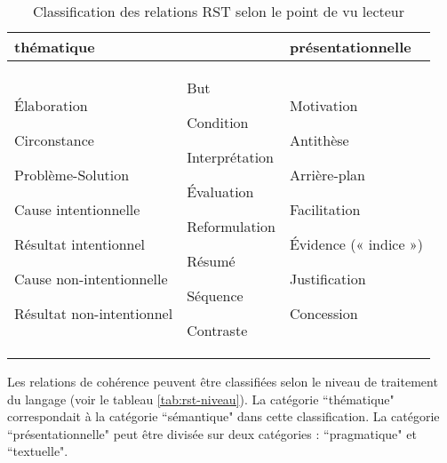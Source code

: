\documentclass{KodeBook}
\begin{document}
\begin{table}[ht]
	\centering\small
\begin{tabular}{p{}p{}p{}}
	\hline\hline
	\textbf{thématique} && \textbf{présentationnelle}\\
	\hline
	
	Élaboration
	
	Circonstance
	
	Problème-Solution
	
	Cause intentionnelle
	
	Résultat intentionnel
	
	Cause non-intentionnelle
	
	Résultat non-intentionnel
	
	& But
	
	Condition
	
	Interprétation
	
	Évaluation
	
	Reformulation
	
	Résumé
	
	Séquence
	
	Contraste
	&
	Motivation
	
	Antithèse
	
	Arrière-plan
	
	Facilitation
	
	Évidence (« indice »)
	
	Justification
	
	Concession\\
	\hline\hline
\end{tabular}
\caption[Classification des relations RST selon le point de vu lecteur]{Classification des relations RST selon le point de vu lecteur \cite{2006-Cornish}}
\label{tab:rst-class-lect}
\end{table}

Les relations de cohérence peuvent être classifiées selon le niveau de traitement du langage (voir le tableau \ref{tab:rst-niveau}).
La catégorie ``thématique" correspondait à la catégorie ``sémantique" dans cette classification. 
La catégorie ``présentationnelle" peut être divisée sur deux catégories : ``pragmatique" et ``textuelle".  
\end{document}
